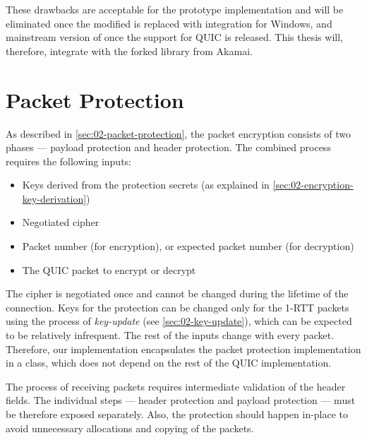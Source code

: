 These drawbacks are acceptable for the prototype implementation and will be eliminated once the
modified \libopenssl{} is replaced with \libschannel{} integration for Windows, and mainstream
version of \libopenssl{} once the support for QUIC is released. This thesis will, therefore,
integrate with the forked \libopenssl{} library from Akamai.

\section{Packet Protection}\label{sec:03-packet-protection}

As described in \autoref{sec:02-packet-protection}, the packet encryption consists of two phases ---
payload protection and header protection. The combined process requires the following inputs:

\begin{itemize}

  \item Keys derived from the protection secrets (as explained in
\autoref{sec:02-encryption-key-derivation})

  \item Negotiated cipher

  \item Packet number (for encryption), or expected packet number (for decryption)

  \item The QUIC packet to encrypt or decrypt

\end{itemize}

The cipher is negotiated once and cannot be changed during the lifetime of the connection. Keys for
the protection can be changed only for the 1-RTT packets using the process of
\textit{\gls{key-update}} (see \autoref{sec:02-key-update}), which can be expected to be relatively
infrequent. The rest of the inputs change with every packet. Therefore, our implementation
encapsulates the packet protection implementation in a  class, which does not
depend on the rest of the QUIC implementation.

The process of receiving packets requires intermediate validation of the header fields. The
individual steps --- header protection and payload protection --- must be therefore exposed
separately. Also, the protection should happen in-place to avoid unnecessary allocations and copying
of the packets.

